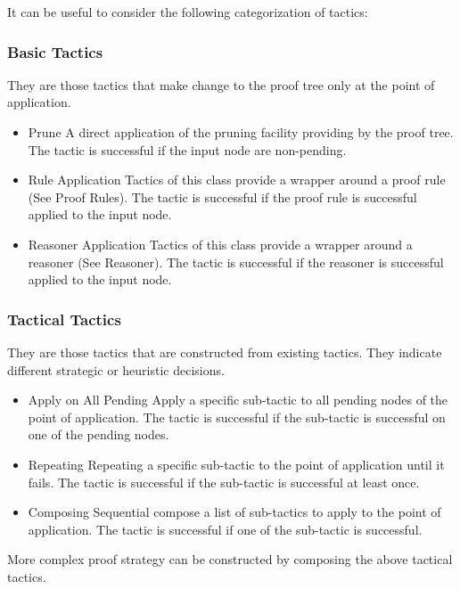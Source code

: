 It can be useful to consider the following categorization of tactics:

\subsubsection{Basic Tactics}

They are those tactics that make change to the proof tree only at the point of application.

\begin{itemize}
	\item     Prune A direct application of the pruning facility providing by the proof tree. The tactic is successful if the input node are non-pending. 
	\item     Rule Application Tactics of this class provide a wrapper around a proof rule (See Proof Rules). The tactic is successful if the proof rule is successful applied to the input node. 

	\item     Reasoner Application Tactics of this class provide a wrapper around a reasoner (See Reasoner). The tactic is successful if the reasoner is successful applied to the input node. 
\end{itemize}

\subsubsection{Tactical Tactics}

They are those tactics that are constructed from existing tactics. They indicate different strategic or heuristic decisions.

\begin{itemize}
	\item         Apply on All Pending Apply a specific sub-tactic to all pending nodes of the point of application. The tactic is successful if the sub-tactic is successful on one of the pending nodes. 
	\item         Repeating Repeating a specific sub-tactic to the point of application until it fails. The tactic is successful if the sub-tactic is successful at least once. 
	\item         Composing Sequential compose a list of sub-tactics to apply to the point of application. The tactic is successful if one of the sub-tactic is successful. 
\end{itemize}

More complex proof strategy can be constructed by composing the above tactical tactics. 

